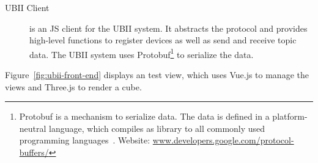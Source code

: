 \begin{description}
  \item[UBII Client] is an \acl{JS} client for the \ac{UBII} system. It abstracts the protocol and provides high-level functions to register devices as well as send and receive topic data. The UBII system uses \acf{Protobuf}\footnote{Protobuf is a mechanism to serialize data. The data is defined in a platform-neutral language, which compiles as library to all commonly used programming languages~\cite{GoogleLLC.2019}. Website: \href{https://developers.google.com/protocol-buffers/}{www.developers.google.com/protocol-buffers/}} to serialize the data.
\end{description}

Figure~\ref{fig:ubii-front-end} displays an test view, which uses Vue.js to manage the views and Three.js to render a cube.